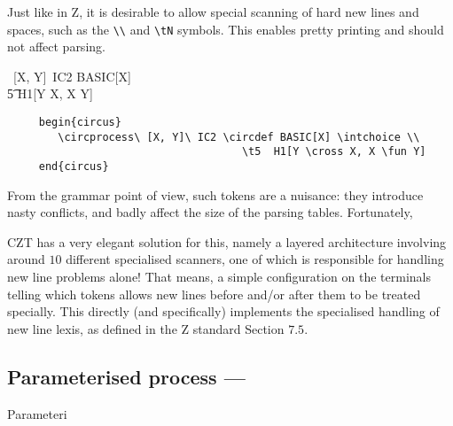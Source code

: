 \documentclass{article}
\begin{document}
Just like in Z, it is desirable to allow special scanning of hard new lines and spaces,
such as the \verb'\\' and \verb'\tN' symbols. This enables pretty printing and should
not affect parsing.
%
\begin{circus}
    \circprocess\ [X, Y]\ IC2 \circdef BASIC[X] \intchoice \\ \t5 H1[Y \cross X, X \fun Y]
\end{circus}
%
\begin{verbatim}
     begin{circus}
        \circprocess\ [X, Y]\ IC2 \circdef BASIC[X] \intchoice \\
                                     \t5  H1[Y \cross X, X \fun Y]
     end{circus}
\end{verbatim}
%
From the grammar point of view, such tokens are a nuisance: they introduce nasty conflicts,
and badly affect the size of the parsing tables. Fortunately,

CZT has a very elegant solution for this, namely a layered architecture involving around
$10$ different specialised scanners, one of which is responsible for handling new line
problems alone! That means, a simple configuration on the  terminals
telling which tokens allows new lines before and/or after them to be treated specially.
This directly (and specifically) implements the specialised handling of new line lexis,
as defined in the Z standard Section $7.5$.




\subsection{Parameterised process --- }

Parameteri
\end{document}
